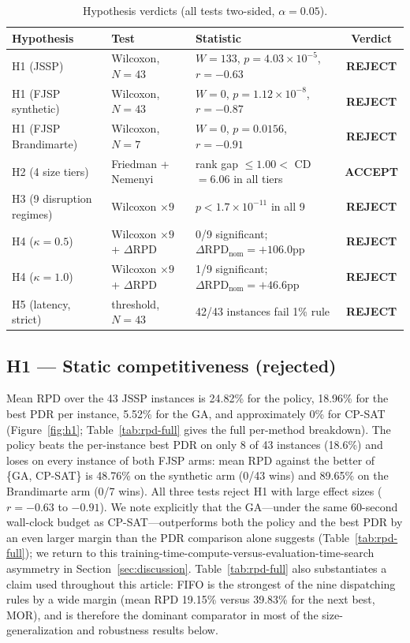 \documentclass[11pt]{article}
\newcommand{\RPD}{\mathrm{RPD}}
\begin{document}
\begin{table}[htbp]
\centering
\caption{Hypothesis verdicts (all tests two-sided, $\alpha=0.05$).}
\label{tab:verdicts}
\small
\begin{tabular}{lp{3.1cm}p{5.4cm}c}
\toprule
\textbf{Hypothesis} & \textbf{Test} & \textbf{Statistic} & \textbf{Verdict} \\
\midrule
H1 (JSSP) & Wilcoxon, $N{=}43$ & $W{=}133$, $p{=}4.03{\times}10^{-5}$, $r{=}{-}0.63$ & \textbf{REJECT} \\
H1 (FJSP synthetic) & Wilcoxon, $N{=}43$ & $W{=}0$, $p{=}1.12{\times}10^{-8}$, $r{=}{-}0.87$ & \textbf{REJECT} \\
H1 (FJSP Brandimarte) & Wilcoxon, $N{=}7$ & $W{=}0$, $p{=}0.0156$, $r{=}{-}0.91$ & \textbf{REJECT} \\
H2 (4 size tiers) & Friedman + Nemenyi & rank gap $\le 1.00 <$ CD$=6.06$ in all tiers & \textbf{ACCEPT} \\
H3 (9 disruption regimes) & Wilcoxon $\times 9$ & $p<1.7{\times}10^{-11}$ in all 9 & \textbf{REJECT} \\
H4 ($\kappa=0.5$) & Wilcoxon $\times 9$ + $\Delta$RPD & 0/9 significant; $\Delta \RPD_{\text{nom}}{=}{+}106.0$pp & \textbf{REJECT} \\
H4 ($\kappa=1.0$) & Wilcoxon $\times 9$ + $\Delta$RPD & 1/9 significant; $\Delta \RPD_{\text{nom}}{=}{+}46.6$pp & \textbf{REJECT} \\
H5 (latency, strict) & threshold, $N{=}43$ & 42/43 instances fail 1\% rule & \textbf{REJECT} \\
\bottomrule
\end{tabular}
\end{table}

\subsection{H1 --- Static competitiveness (rejected)}
\label{sec:h1}

Mean RPD over the 43 JSSP instances is 24.82\% for the policy, 18.96\% for the best PDR per instance, 5.52\% for the GA, and approximately 0\% for CP-SAT (Figure~\ref{fig:h1}; Table~\ref{tab:rpd-full} gives the full per-method breakdown). The policy beats the per-instance best PDR on only 8 of 43 instances (18.6\%) and loses on every instance of both FJSP arms: mean RPD against the better of \{GA, CP-SAT\} is 48.76\% on the synthetic arm (0/43 wins) and 89.65\% on the Brandimarte arm (0/7 wins). All three tests reject H1 with large effect sizes ($r=-0.63$ to $-0.91$). We note explicitly that the GA---under the same 60-second wall-clock budget as CP-SAT---outperforms both the policy and the best PDR by an even larger margin than the PDR comparison alone suggests (Table~\ref{tab:rpd-full}); we return to this training-time-compute-versus-evaluation-time-search asymmetry in Section~\ref{sec:discussion}. Table~\ref{tab:rpd-full} also substantiates a claim used throughout this article: FIFO is the strongest of the nine dispatching rules by a wide margin (mean RPD 19.15\% versus 39.83\% for the next best, MOR), and is therefore the dominant comparator in most of the size-generalization and robustness results below.
\end{document}
